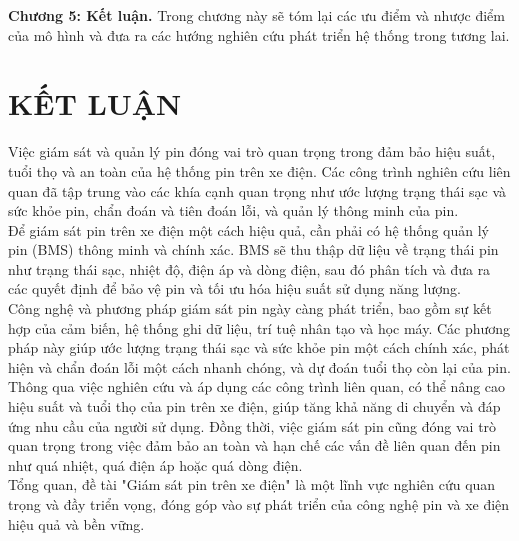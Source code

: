 \documentclass[a4paper,11pt]{article}
\theoremstyle{mytheor}
\begin{document}
\textbf{Chương 5: Kết luận.} Trong chương này sẽ tóm lại các ưu điểm và nhược điểm của mô hình và đưa ra các hướng nghiên cứu phát triển hệ thống trong tương lai.\\

\section{KẾT LUẬN}
Việc giám sát và quản lý pin đóng vai trò quan trọng trong đảm bảo hiệu suất, tuổi thọ và an toàn của hệ thống pin trên xe điện. Các công trình nghiên cứu liên quan đã tập trung vào các khía cạnh quan trọng như ước lượng trạng thái sạc và sức khỏe pin, chẩn đoán và tiên đoán lỗi, và quản lý thông minh của pin.\\

Để giám sát pin trên xe điện một cách hiệu quả, cần phải có hệ thống quản lý pin (BMS) thông minh và chính xác. BMS sẽ thu thập dữ liệu về trạng thái pin như trạng thái sạc, nhiệt độ, điện áp và dòng điện, sau đó phân tích và đưa ra các quyết định để bảo vệ pin và tối ưu hóa hiệu suất sử dụng năng lượng.\\

Công nghệ và phương pháp giám sát pin ngày càng phát triển, bao gồm sự kết hợp của cảm biến, hệ thống ghi dữ liệu, trí tuệ nhân tạo và học máy. Các phương pháp này giúp ước lượng trạng thái sạc và sức khỏe pin một cách chính xác, phát hiện và chẩn đoán lỗi một cách nhanh chóng, và dự đoán tuổi thọ còn lại của pin.\\

Thông qua việc nghiên cứu và áp dụng các công trình liên quan, có thể nâng cao hiệu suất và tuổi thọ của pin trên xe điện, giúp tăng khả năng di chuyển và đáp ứng nhu cầu của người sử dụng. Đồng thời, việc giám sát pin cũng đóng vai trò quan trọng trong việc đảm bảo an toàn và hạn chế các vấn đề liên quan đến pin như quá nhiệt, quá điện áp hoặc quá dòng điện.\\

Tổng quan, đề tài "Giám sát pin trên xe điện" là một lĩnh vực nghiên cứu quan trọng và đầy triển vọng, đóng góp vào sự phát triển của công nghệ pin và xe điện hiệu quả và bền vững.\\
\end{document}
